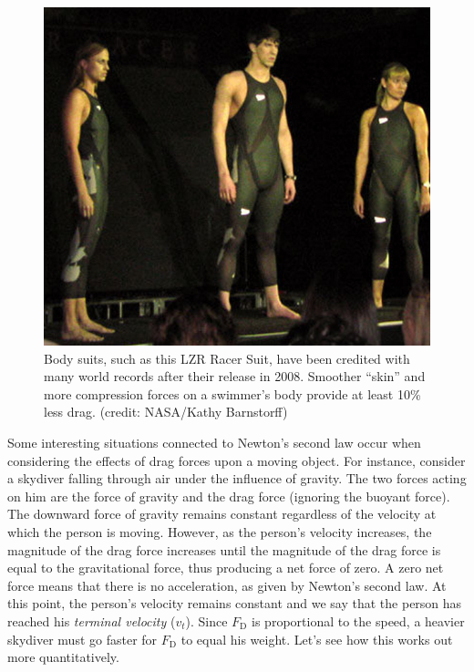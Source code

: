 \documentclass[
]{book}
\begin{document}
\begin{figure}
\hypertarget{import-auto-id1165298678773}{%
\centering
\includegraphics{images/Figure_06_02_05a.jpg}
\caption{Body suits, such as this LZR Racer Suit, have been credited with many
world records after their release in 2008. Smoother ``skin'' and more
compression forces on a swimmer's body provide at least 10\% less drag.
(credit: NASA/Kathy
Barnstorff)}\label{import-auto-id1165298678773}
}
\end{figure}

Some interesting situations connected to Newton's second law occur when
considering the effects of drag forces upon a moving object. For
instance, consider a skydiver falling through air under the influence of
gravity. The two forces acting on him are the force of gravity and the
drag force (ignoring the buoyant force). The downward force of gravity
remains constant regardless of the velocity at which the person is
moving. However, as the person's velocity increases, the magnitude of
the drag force increases until the magnitude of the drag force is equal
to the gravitational force, thus producing a net force of zero. A zero
net force means that there is no acceleration, as given by Newton's
second law. At this point, the person's velocity remains constant and
we say that the person has reached his \emph{terminal velocity} (\(v_{t}{}\)).
Since \(F_{\text{D}}{}\) is proportional to the speed, a heavier skydiver
must go faster for \(F_{\text{D}}{}\) to equal his weight. Let's see how
this works out more quantitatively.
\end{document}
